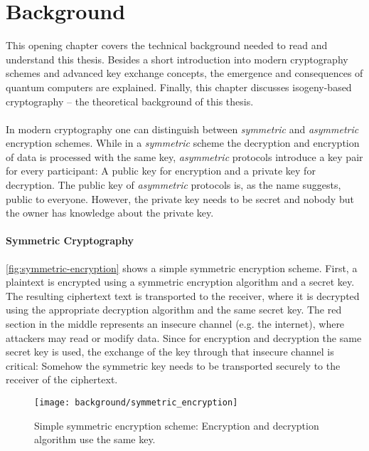 \chapter{Background}\label{chapter:background}

This opening chapter covers the technical background needed to read and understand this thesis. Besides a short introduction into modern cryptography schemes and advanced key exchange concepts, the emergence and consequences of quantum computers are explained. Finally, this chapter discusses isogeny-based cryptography -- the theoretical background of this thesis.
\\\\
In modern cryptography one can distinguish between \textit{symmetric} and \textit{asymmetric} encryption schemes. While in a \textit{symmetric} scheme the decryption and encryption of data is processed with the same key, \textit{asymmetric} protocols introduce a key pair for every participant: A public key for encryption and a private key for decryption. The public key of \textit{asymmetric} protocols is, as the name suggests, public to everyone. However, the private key needs to be secret and nobody but the owner has knowledge about the private key.

\subsubsection{Symmetric Cryptography}

\autoref{fig:symmetric-encryption} shows a simple symmetric encryption scheme. First, a plaintext is encrypted using a symmetric encryption algorithm and a secret key. The resulting ciphertext text is transported to the receiver, where it is decrypted using the appropriate decryption algorithm and the same secret key. The red section in the middle represents an insecure channel (e.g. the internet), where attackers may read or modify data. Since for encryption and decryption the same secret key is used, the exchange of the key through that insecure channel is critical: Somehow the symmetric key needs to be transported securely to the receiver of the ciphertext.

\begin{figure}[htpb]
	\centering
	\texttt{[image: background/symmetric\_encryption]}
	\caption[Symmetric encryption scheme]{Simple symmetric encryption scheme: Encryption and decryption algorithm use the same key.} \label{fig:symmetric-encryption}
\end{figure}

